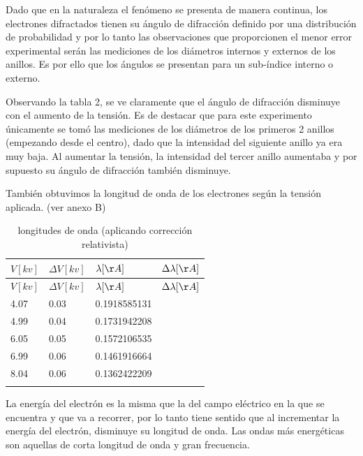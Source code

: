 \documentclass[]{article}
\begin{document}
Dado que en la naturaleza el fenómeno se presenta de manera continua,
los electrones difractados tienen su ángulo de difracción definido por
una distribución de probabilidad y por lo tanto las observaciones que
proporcionen el menor error experimental serán las mediciones de los
diámetros internos y externos de los anillos. Es por ello que los
ángulos se presentan para un sub-índice interno o externo.

Observando la tabla 2, se ve claramente que el ángulo de difracción
disminuye con el aumento de la tensión. Es de destacar que para este
experimento únicamente se tomó las mediciones de los diámetros de los
primeros 2 anillos (empezando desde el centro), dado que la intensidad
del siguiente anillo ya era muy baja. Al aumentar la tensión, la
intensidad del tercer anillo aumentaba y por supuesto su ángulo de
difracción también disminuye.

También obtuvimos la longitud de onda de los electrones según la tensión
aplicada. (ver anexo B)

\begin{longtable}[]{@{}llll@{}}
\toprule
\(V[kv]\) & \(\Delta V [kv]\) & \(\lambda [\AA]\) &
\(\Delta \lambda [\AA]\)\tabularnewline
\midrule
\endfirsthead
\toprule
\(V[kv]\) & \(\Delta V [kv]\) & \(\lambda [\AA]\) &
\(\Delta \lambda [\AA]\)\tabularnewline
\midrule
\endhead
4.07 & 0.03 & 0.1918585131 &\tabularnewline
4.99 & 0.04 & 0.1731942208 &\tabularnewline
6.05 & 0.05 & 0.1572106535 &\tabularnewline
6.99 & 0.06 & 0.1461916664 &\tabularnewline
8.04 & 0.06 & 0.1362422209 &\tabularnewline
\bottomrule
\caption{longitudes de onda (aplicando corrección
relativista)}\tabularnewline
\end{longtable}

La energía del electrón es la misma que la del campo eléctrico en la que
se encuentra y que va a recorrer, por lo tanto tiene sentido que al
incrementar la energía del electrón, disminuye su longitud de onda. Las
ondas más energéticas son aquellas de corta longitud de onda y gran
frecuencia.
\end{document}
